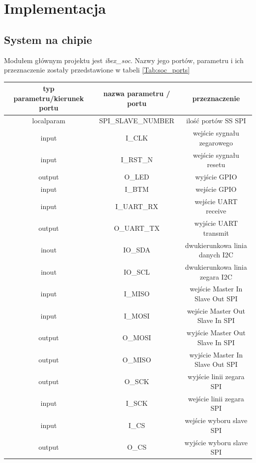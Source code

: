 \documentclass[11pt,a4paper]{article}
\begin{document}
\newpage

\section{Implementacja}

	\subsection{System na chipie}
	\hspace{5mm}
	Modułem głównym projektu jest \textit{ibex\_soc}. Nazwy jego portów, parametru i ich przeznaczenie zostały przedstawione w tabeli \ref{Tab:soc_ports}

			\begin{center}
			\small
				\begin{tabular}{|c|c|c|}
					\hline
					typ parametru/kierunek portu & nazwa parametru / portu & przeznaczenie \\
					\hline
					localparam & SPI\_SLAVE\_NUMBER & ilość portów SS SPI \\
					\hline
					input & I\_CLK & wejście sygnału zegarowego  \\
					\hline
					input & I\_RST\_N & wejście sygnału resetu \\
					\hline
					output & O\_LED & wyjście GPIO \\
					\hline
					input & I\_BTM & wejście GPIO \\
					\hline
					input & I\_UART\_RX & wejście UART receive \\
					\hline
					output & O\_UART\_TX & wyjście UART transmit \\
					\hline
					inout & IO\_SDA & dwukierunkowa linia danych I2C \\
					\hline		
					inout & IO\_SCL & dwukierunkowa linia zegara I2C \\
					\hline	
					input & I\_MISO & wejście Master In Slave Out SPI \\
					\hline		
					input & I\_MOSI & wejście Master Out Slave In SPI \\
					\hline	
					output & O\_MOSI & wyjście Master Out Slave In SPI \\
					\hline		
					output & O\_MISO & wyjście Master In Slave Out SPI \\
					\hline																			output & O\_SCK & wyjście linii zegara SPI \\
					\hline	
					input & I\_SCK & wejście linii zegara SPI \\
					\hline		
					input & I\_CS & wejście wyboru slave SPI \\
					\hline		
					output & O\_CS & wyjście wyboru slave SPI \\
					\hline				
				\end{tabular}
		\end{center}
\end{document}

